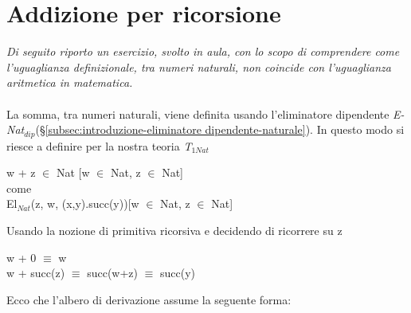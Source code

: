 \section{Addizione per ricorsione}
\label{subsec: addizione-per-ricorsione}
\textit{Di seguito riporto un esercizio, svolto in aula, con lo scopo di comprendere come l'uguaglianza definizionale, tra numeri naturali, non coincide con l'uguaglianza aritmetica in matematica.}
\\\\
La somma, tra numeri naturali, viene definita usando l'eliminatore dipendente \textit{E-Nat$_{dip}$}(\S \ref{subsec:introduzione-eliminatore dipendente-naturale}). In questo modo si riesce a definire per la nostra teoria \textit{T$_{1Nat}$}
\begin{center} w + z $\in$ Nat [w $\in$ Nat, z $\in$ Nat] \\ come \\ El$_{Nat}$(z, w, (x,y).succ(y))[w $\in$ Nat, z $\in$ Nat]\end{center}
Usando la nozione di primitiva ricorsiva e decidendo di ricorrere su z \begin{center} w + 0 $\equiv$ w \\ w + succ(z) $\equiv$ succ(w+z) $\equiv$ succ(y)\end{center}
Ecco che l'albero di derivazione assume la seguente forma:
\tiny
\begin{adjustwidth}{-11em}{}
\begin{prooftree}
\end{prooftree}
\end{adjustwidth}

